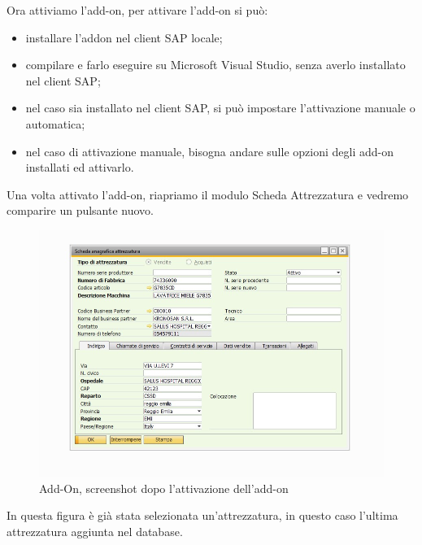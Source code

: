 \newpage

\begin{flushleft}
	Ora attiviamo l'add-on, per attivare l'add-on si può:
\end{flushleft}
\begin{itemize}
	\item installare l'addon nel client SAP locale;
	\item compilare e farlo eseguire su Microsoft Visual Studio, senza averlo installato nel client SAP;
	\item nel caso sia installato nel client SAP, si può impostare l'attivazione manuale o automatica;
	\item nel caso di attivazione manuale, bisogna andare sulle opzioni degli add-on installati ed attivarlo.
\end{itemize} 
\begin{flushleft}
	
	Una volta attivato l'add-on, riapriamo il modulo Scheda Attrezzatura e vedremo comparire un pulsante nuovo.
	
\end{flushleft}
\begin{figure}[!h] 
	\centering 
	\includegraphics[scale = 0.6]{immagini/add-on/addon-scheda-yesbutton.jpg} 
	\caption{Add-On, screenshot dopo l'attivazione dell'add-on}
\end{figure}
\begin{flushleft}
	
	In questa figura è già stata selezionata un'attrezzatura, in questo caso l'ultima attrezzatura aggiunta nel database.
	
\end{flushleft}


